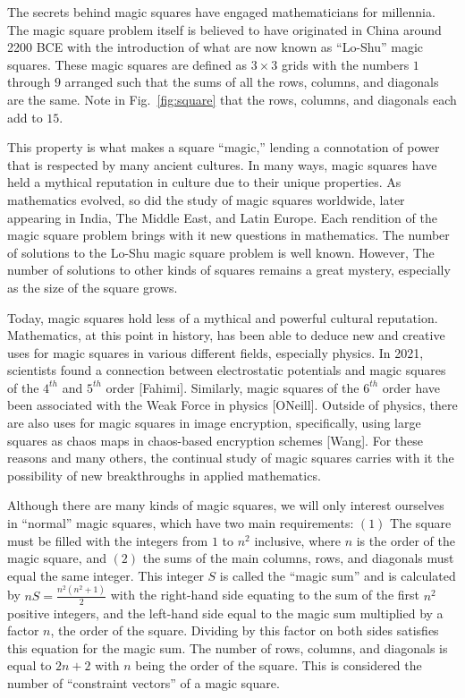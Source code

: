 \documentclass[12pt]{report}
\begin{document}
\par The secrets behind magic squares have engaged mathematicians for millennia. The magic square
problem itself is believed to have originated in China around 2200 BCE with the introduction of
what are now known as “Lo-Shu” magic squares. These magic squares are defined as $3\times3$ grids
with the numbers $1$ through $9$ arranged such that the sums of all the rows, columns, and
diagonals are the same. Note in Fig.~\ref{fig:square} that the rows, columns, and diagonals each
add to $15$.

\par This property is what makes a square ``magic,'' lending a connotation of power that is
respected by many ancient cultures. In many ways, magic squares have held a mythical reputation in
culture due to their unique properties. As mathematics evolved, so did the study of magic squares
worldwide, later appearing in India, The Middle East, and Latin Europe. Each rendition of the magic
square problem brings with it new questions in mathematics. The number of solutions to the Lo-Shu
magic square problem is well known. However, The number of solutions to other kinds of squares
remains a great mystery, especially as the size of the square grows.

\par Today, magic squares hold less of a mythical and powerful cultural reputation. Mathematics, at
this point in history, has been able to deduce new and creative uses for magic squares in various
different fields, especially physics. In 2021, scientists found a connection between electrostatic
potentials and magic squares of the $4^{th}$ and $5^{th}$ order [Fahimi]. Similarly, magic squares
of the $6^{th}$ order have been associated with the Weak Force in physics [ONeill]. Outside of
physics, there are also uses for magic squares in image encryption, specifically, using large
squares as chaos maps in chaos-based encryption schemes [Wang]. For these reasons and many others,
the continual study of magic squares carries with it the possibility of new breakthroughs in
applied mathematics.

\par Although there are many kinds of magic squares, we will only interest ourselves in ``normal''
magic squares, which have two main requirements: $(1)$ The square must be filled with the integers
from $1$ to $n^2$ inclusive, where $n$ is the order of the magic square, and $(2)$ the sums of the
main columns, rows, and diagonals must equal the same integer. This integer $S$ is called the
``magic sum'' and is calculated by $nS = \frac{n^2(n^{2}+1)}{2}$ with the right-hand side equating
to the sum of the first $n^2$ positive integers, and the left-hand side equal to the magic sum
multiplied by a factor $n$, the order of the square. Dividing by this factor on both sides
satisfies this equation for the magic sum. The number of rows, columns, and diagonals is equal to
$2n+2$ with $n$ being the order of the square. This is considered the number of ``constraint
vectors'' of a magic square.
\end{document}
